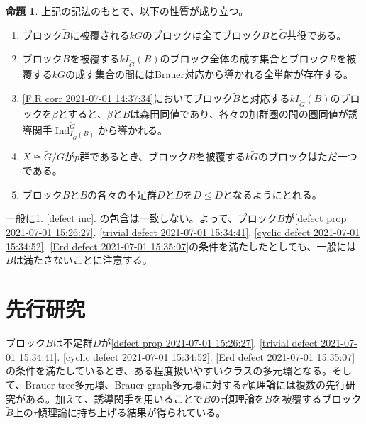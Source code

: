 \documentclass[a4paper,uplatex,dvipdfmx]{jsarticle}
\theoremstyle{definition}
\newtheorem{proposition}[theorem]{命題}
\newcommand{\induc}{{\operatorname{Ind}\nolimits}}
\newcommand{\inertiagp}{I}
\begin{document}
\begin{proposition}\label{cover prop 2021-07-01 15:26:44}
  上記の記法のもとで、以下の性質が成り立つ。
  \begin{enumerate}
    \item ブロック\(\widetilde{B}\)に被覆される\(kG\)のブロックは全てブロック\(B\)と\(\widetilde{G}\)共役である。
    \item ブロック\(B\)を被覆する\(k\inertiagp_{\widetilde{G}}(B)\)のブロック全体の成す集合とブロック\(B\)を被覆する\(k\widetilde{G}\)の成す集合の間にはBrauer対応から導かれる全単射が存在する。\label{F.R corr 2021-07-01 14:37:34}
    \item \cref{F.R corr 2021-07-01 14:37:34}においてブロック\(\widetilde{B}\)と対応する\(k\inertiagp_{\widetilde{G}}(B)\)のブロックを\(\beta\)とすると、\(\beta\)と\(\widetilde{B}\)は森田同値であり、各々の加群圏の間の圏同値が誘導関手\(\induc_{\inertiagp_{\widetilde{G}}(B)}^{\widetilde{G}}\)から導かれる。
    \item \(X\cong \widetilde{G}/G\)が\(p\)群であるとき、ブロック\(B\)を被覆する\(k\widetilde{G}\)のブロックはただ一つである。\label{p cover 2021-07-04 07:28:55}
    \item ブロック\(B\)と\(\widetilde{B}\)の各々の不足群\(D\)と\(\widetilde{D}\)を\(D\leq\widetilde{D}\)となるようにとれる。\label{defect inc}
  \end{enumerate}
\end{proposition}
一般に\cref{cover prop 2021-07-01 15:26:44}. \cref{defect inc}. の包含は一致しない。よって、ブロック\(B\)が\cref{defect prop 2021-07-01 15:26:27}. \cref{trivial defect 2021-07-01 15:34:41}. \cref{cyclic defect 2021-07-01 15:34:52}. \cref{Erd defect 2021-07-01 15:35:07}の条件を満たしたとしても、一般には\(\widetilde{B}\)は満たさないことに注意する。
\section{先行研究}
ブロック\(B\)は不足群\(D\)が\cref{defect prop 2021-07-01 15:26:27}. \cref{trivial defect 2021-07-01 15:34:41}. \cref{cyclic defect 2021-07-01 15:34:52}. \cref{Erd defect 2021-07-01 15:35:07}の条件を満たしているとき、ある程度扱いやすいクラスの多元環となる。そして、Brauer tree多元環、Brauer graph多元環に対する\(\tau\)傾理論には複数の先行研究がある。加えて、誘導関手を用いることで\(B\)の\(\tau\)傾理論を\(B\)を被覆するブロック\(\widetilde{B}\)上の\(\tau\)傾理論に持ち上げる結果が得られている。
\end{document}
